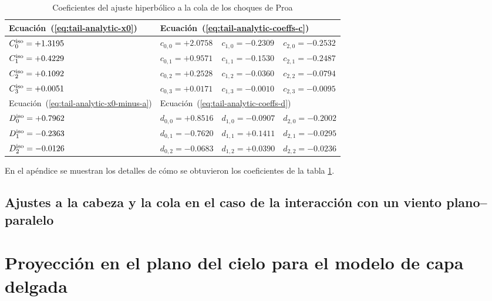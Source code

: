 \begin{table}
  \caption{Coeficientes del ajuste hiperbólico a la cola de los choques de Proa}
  \label{tab:tail-fit-coeffs}
  \renewcommand\arraystretch{1.2}
  \setlength\tabcolsep{0.5\tabcolsep}
  \begin{tabular}{@{}llll@{}}
    \toprule
    Ecuación~(\ref{eq:tail-analytic-x0}) & 
    \multicolumn{3}{l}{
    Ecuación~(\ref{eq:tail-analytic-coeffs-c}) \dotfill
    } \\ \midrule
    \( C^{\mathrm{iso}}_0 = +1.3195     \)    
    & \( c_{0,0} = +2.0758   \)  
    & \( c_{1,0} = -0.2309   \)  
    & \( c_{2,0} = -0.2532   \)\\
      \( C^{\mathrm{iso}}_1 = +0.4229     \)    
    & \( c_{0,1} = +0.9571   \)  
    & \( c_{1,1} = -0.1530   \)  
    & \( c_{2,1} = -0.2487   \)\\
      \( C^{\mathrm{iso}}_2 = +0.1092     \)    
    & \( c_{0,2} = +0.2528   \)  
    & \( c_{1,2} = -0.0360   \)  
    & \( c_{2,2} = -0.0794   \)\\
      \( C^{\mathrm{iso}}_3 = +0.0051     \)    
    & \( c_{0,3} = +0.0171   \)  
    & \( c_{1,3} = -0.0010   \)  
    & \( c_{2,3} = -0.0095   \)\\ \midrule
    Ecuación~(\ref{eq:tail-analytic-x0-minus-a}) &
    \multicolumn{3}{l}{
    Ecuación~(\ref{eq:tail-analytic-coeffs-d}) \dotfill
    } \\ \midrule
    \( D^{\mathrm{iso}}_0 = +0.7962   \)    
    & \( d_{0,0} = +0.8516 \)  
    & \( d_{1,0} = -0.0907 \)  
    & \( d_{2,0} = -0.2002 \)\\
      \( D^{\mathrm{iso}}_1 = -0.2363   \)    
    & \( d_{0,1} = -0.7620 \)  
    & \( d_{1,1} = +0.1411 \)  
    & \( d_{2,1} = -0.0295 \)\\
      \( D^{\mathrm{iso}}_2 = -0.0126   \)    
    & \( d_{0,2} = -0.0683 \)  
    & \( d_{1,2} = +0.0390 \)  
    & \( d_{2,2} = -0.0236 \)\\
    \bottomrule
  \end{tabular}
\end{table}

 
 En el apéndice  se muestran los detalles de cómo se obtuvieron los coeficientes de la tabla \ref{tab:tail-fit-coeffs}.
 
 \subsection{Ajustes a la cabeza y la cola en el caso de la interacción con un viento plano--paralelo}

 \section{Proyección en el plano del cielo para el modelo de capa delgada}

 
 